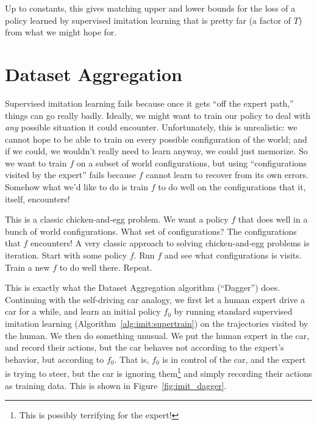 Up to constants, this gives matching upper and lower bounds for the loss of a policy learned by supervised imitation learning that is pretty far (a factor of $T$) from what we might hope for.

\section{Dataset Aggregation}

Supervised imitation learning fails because once it gets ``off the expert path,'' things can go really badly.
Ideally, we might want to train our policy to deal with \emph{any} possible situation it could encounter.
Unfortunately, this is unrealistic: we cannot hope to be able to train on every possible configuration of the world; and if we could, we wouldn't really need to learn anyway, we could just memorize.
So we want to train $f$ on a subset of world configurations, but using ``configurations visited by the expert'' fails because $f$ cannot learn to recover from its own errors.
Somehow what we'd like to do is train $f$ to do well on the configurations that it, itself, encounters!

This is a classic chicken-and-egg problem.
We want a policy $f$ that does well in a bunch of world configurations.
What set of configurations?
The configurations that $f$ encounters!
A very classic approach to solving chicken-and-egg problems is iteration.
Start with some policy $f$.
Run $f$ and see what configurations is visits.
Train a new $f$ to do well there.
Repeat.

This is exactly what the Dataset Aggregation algorithm (``Dagger'') does.
Continuing with the self-driving car analogy, we first let a human expert drive a car for a while, and learn an initial policy $f_0$ by running standard supervised imitation learning (Algorithm~\ref{alg:imit:supertrain}) on the trajectories visited by the human.
We then do something unusual.
We put the human expert in the car, and record their actions, but the car behaves not according to the expert's behavior, but according to $f_0$.
That is, $f_0$ is in control of the car, and the expert is trying to steer, but the car is ignoring them\footnote{This is possibly terrifying for the expert!} and simply recording their actions as training data.
This is shown in Figure~\ref{fig:imit_dagger}.

\MoveNextFigure{-12cm}

